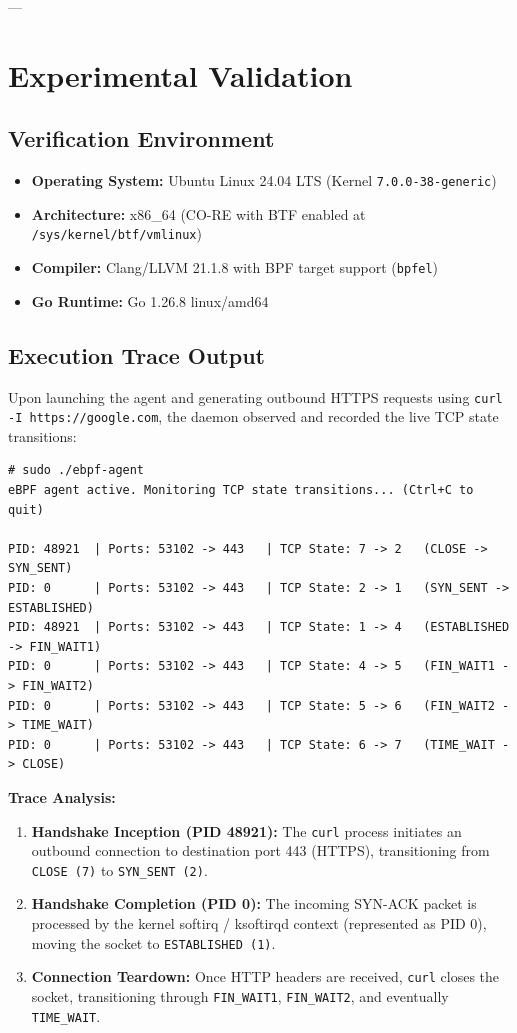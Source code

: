 \documentclass[11pt,a4paper]{article}
\begin{document}
---

\section{Experimental Validation}

\subsection{Verification Environment}
\begin{itemize}
    \item \textbf{Operating System:} Ubuntu Linux 24.04 LTS (Kernel \texttt{7.0.0-38-generic})
    \item \textbf{Architecture:} x86\_64 (CO-RE with BTF enabled at \texttt{/sys/kernel/btf/vmlinux})
    \item \textbf{Compiler:} Clang/LLVM 21.1.8 with BPF target support (\texttt{bpfel})
    \item \textbf{Go Runtime:} Go 1.26.8 linux/amd64
\end{itemize}

\subsection{Execution Trace Output}
Upon launching the agent and generating outbound HTTPS requests using \texttt{curl -I https://google.com}, the daemon observed and recorded the live TCP state transitions:

\begin{lstlisting}[style=backcolour, basicstyle=\ttfamily\scriptsize, frame=single]
# sudo ./ebpf-agent
eBPF agent active. Monitoring TCP state transitions... (Ctrl+C to quit)

PID: 48921  | Ports: 53102 -> 443   | TCP State: 7 -> 2   (CLOSE -> SYN_SENT)
PID: 0      | Ports: 53102 -> 443   | TCP State: 2 -> 1   (SYN_SENT -> ESTABLISHED)
PID: 48921  | Ports: 53102 -> 443   | TCP State: 1 -> 4   (ESTABLISHED -> FIN_WAIT1)
PID: 0      | Ports: 53102 -> 443   | TCP State: 4 -> 5   (FIN_WAIT1 -> FIN_WAIT2)
PID: 0      | Ports: 53102 -> 443   | TCP State: 5 -> 6   (FIN_WAIT2 -> TIME_WAIT)
PID: 0      | Ports: 53102 -> 443   | TCP State: 6 -> 7   (TIME_WAIT -> CLOSE)
\end{lstlisting}

\noindent\textbf{Trace Analysis:}
\begin{enumerate}
    \item \textbf{Handshake Inception (PID 48921):} The \texttt{curl} process initiates an outbound connection to destination port 443 (HTTPS), transitioning from \texttt{CLOSE (7)} to \texttt{SYN\_SENT (2)}.
    \item \textbf{Handshake Completion (PID 0):} The incoming SYN-ACK packet is processed by the kernel softirq / ksoftirqd context (represented as PID 0), moving the socket to \texttt{ESTABLISHED (1)}.
    \item \textbf{Connection Teardown:} Once HTTP headers are received, \texttt{curl} closes the socket, transitioning through \texttt{FIN\_WAIT1}, \texttt{FIN\_WAIT2}, and eventually \texttt{TIME\_WAIT}.
\end{enumerate}
\end{document}

